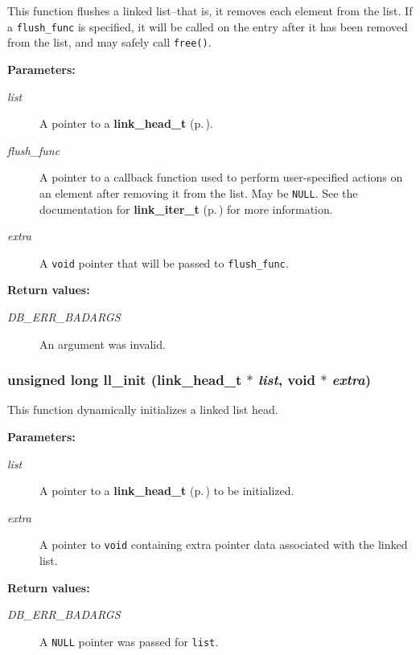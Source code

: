  This function flushes a linked list--that is, it removes each element from the list. If a {\tt flush\_\-func} is specified, it will be called on the entry after it has been removed from the list, and may safely call {\tt free()}.\begin{Desc}
\item[{\bf Parameters: }]\par
\begin{description}
\item[
{\em list}]A pointer to a {\bf link\_\-head\_\-t} {\rm (p.\,\pageref{group__dbprim__link_a0})}. \item[
{\em flush\_\-func}]A pointer to a callback function used to perform user-specified actions on an element after removing it from the list. May be {\tt NULL}. See the documentation for {\bf link\_\-iter\_\-t} {\rm (p.\,\pageref{group__dbprim__link_a2})} for more information. \item[
{\em extra}]A {\tt void} pointer that will be passed to {\tt flush\_\-func}.\end{description}
\end{Desc}
\begin{Desc}
\item[{\bf Return values: }]\par
\begin{description}
\item[
{\em DB\_\-ERR\_\-BADARGS}]An argument was invalid. \end{description}
\end{Desc}
\subsubsection{\setlength{\rightskip}{0pt plus 5cm}unsigned long ll\_\-init ({\bf link\_\-head\_\-t} $\ast$ {\em list}, void $\ast$ {\em extra})}\label{group__dbprim__link_a5}




 This function dynamically initializes a linked list head.\begin{Desc}
\item[{\bf Parameters: }]\par
\begin{description}
\item[
{\em list}]A pointer to a {\bf link\_\-head\_\-t} {\rm (p.\,\pageref{group__dbprim__link_a0})} to be initialized. \item[
{\em extra}]A pointer to {\tt void} containing extra pointer data associated with the linked list.\end{description}
\end{Desc}
\begin{Desc}
\item[{\bf Return values: }]\par
\begin{description}
\item[
{\em DB\_\-ERR\_\-BADARGS}]A {\tt NULL} pointer was passed for {\tt list}. \end{description}
\end{Desc}
